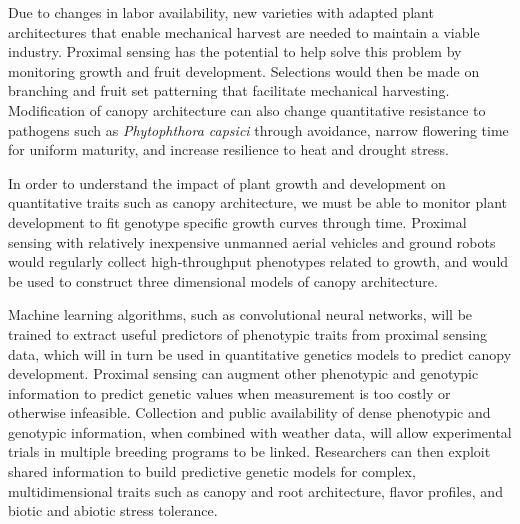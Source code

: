 \documentclass[11pt]{article}
\begin{document}



Due to changes in labor availability, new varieties with adapted plant architectures that enable mechanical harvest are needed to maintain a viable industry. Proximal sensing has the potential to help solve this problem by monitoring growth and fruit development. Selections would then be made on branching and fruit set patterning that facilitate mechanical harvesting. Modification of canopy architecture can also change quantitative resistance to pathogens such as \emph{Phytophthora capsici} through avoidance, narrow flowering time for uniform maturity, and increase resilience to heat and drought stress.

In order to understand the impact of plant growth and development on quantitative traits such as canopy architecture, we must be able to monitor plant development to fit genotype specific growth curves through time. Proximal sensing with relatively inexpensive unmanned aerial vehicles and ground robots would regularly collect high-throughput phenotypes related to growth, and would be used to construct three dimensional models of canopy architecture. 

Machine learning algorithms, such as convolutional neural networks, will be trained to extract useful predictors of phenotypic traits from proximal sensing data, which will in turn be used in quantitative genetics models to predict canopy development. Proximal sensing can augment other phenotypic and genotypic information to predict genetic values when measurement is too costly or otherwise infeasible. Collection and public availability of dense phenotypic and genotypic information, when combined with weather data, will allow experimental trials in multiple breeding programs to be linked. Researchers can then exploit shared information to build predictive genetic models for complex, multidimensional traits such as canopy and root architecture, flavor profiles, and biotic and abiotic stress tolerance.



\end{document}

